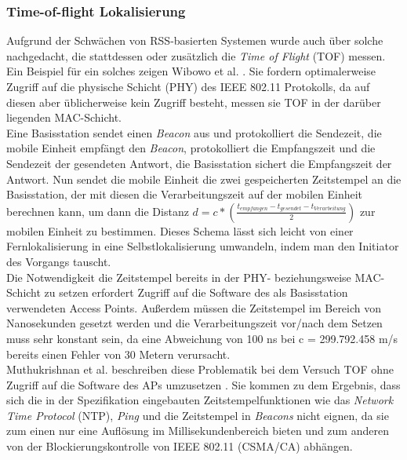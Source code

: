 \subsubsection{Time-of-flight Lokalisierung}
\label{ch:Vorherige:sec:TOF}
Aufgrund der Schwächen von RSS-basierten Systemen wurde auch über solche nachgedacht, die stattdessen oder zusätzlich die \emph{Time of Flight} (TOF) messen. 
Ein Beispiel für ein solches zeigen Wibowo et al. \cite{wibowo2009time}. 
Sie fordern optimalerweise Zugriff auf die physische Schicht (PHY) des IEEE 802.11 Protokolls, da auf diesen aber üblicherweise kein Zugriff besteht, messen sie TOF in der darüber liegenden MAC-Schicht.\\
Eine Basisstation sendet einen \emph{Beacon} aus und protokolliert die Sendezeit, die mobile Einheit empfängt den \emph{Beacon}, protokolliert die Empfangszeit und die Sendezeit der gesendeten Antwort, die Basisstation sichert die Empfangszeit der Antwort.
Nun sendet die mobile Einheit die zwei gespeicherten Zeitstempel an die Basisstation, der mit diesen die Verarbeitungszeit auf der mobilen Einheit berechnen kann, um dann die Distanz $d = c * (\frac{t_{empfangen} - t_{gesendet} - t_{Verarbeitung}}{2})$ zur mobilen Einheit zu bestimmen.
Dieses Schema lässt sich leicht von einer Fernlokalisierung in eine Selbstlokalisierung umwandeln, indem man den Initiator des Vorgangs tauscht.\\
Die Notwendigkeit die Zeitstempel bereits in der PHY- beziehungsweise MAC-Schicht zu setzen erfordert Zugriff auf die Software des als Basisstation verwendeten Access Points. 
Außerdem müssen die Zeitstempel im Bereich von Nanosekunden gesetzt werden und die Verarbeitungszeit vor/nach dem Setzen muss sehr konstant sein, da eine Abweichung von 100 ns bei c = 299.792.458 m/s bereits einen Fehler von 30 Metern verursacht.\\
Muthukrishnan et al. beschreiben diese Problematik bei dem Versuch TOF ohne Zugriff auf die Software des APs umzusetzen \cite{muthukrishnan2006using}.
Sie kommen zu dem Ergebnis, dass sich die in der Spezifikation eingebauten Zeitstempelfunktionen wie das \emph{Network Time Protocol} (NTP), \emph{Ping} und die Zeitstempel in \emph{Beacons} nicht eignen, da sie zum einen nur eine Auflösung im Millisekundenbereich bieten und zum anderen von der Blockierungskontrolle von IEEE 802.11 (CSMA/CA) abhängen.

